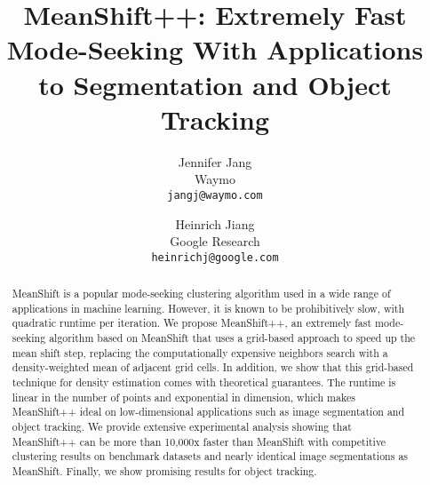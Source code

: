 \documentclass[final]{cvpr}
\theoremstyle{definition}
\begin{document}
\title{MeanShift++: Extremely Fast Mode-Seeking With Applications to Segmentation and Object Tracking}

\author{Jennifer Jang\\
Waymo\\
{\tt\small jangj@waymo.com}
\and
Heinrich Jiang\\
Google Research\\
{\tt\small heinrichj@google.com}
}

\maketitle


\begin{abstract}
   MeanShift is a popular mode-seeking clustering algorithm used in a wide range of applications in machine learning. However, it is known to be prohibitively slow, with quadratic runtime per iteration. We propose MeanShift++, an extremely fast mode-seeking algorithm based on MeanShift that uses a grid-based approach to speed up the mean shift step, replacing the computationally expensive neighbors search with a density-weighted mean of adjacent grid cells. In addition, we show that this grid-based technique for density estimation comes with theoretical guarantees. The runtime is linear in the number of points and exponential in dimension, which makes MeanShift++ ideal on low-dimensional applications such as image segmentation and object tracking. We provide extensive experimental analysis showing that MeanShift++ can be more than 10,000x faster than MeanShift with competitive clustering results on benchmark datasets and nearly identical image segmentations as MeanShift. Finally, we show promising results for object tracking.
\end{abstract}











\clearpage
{\small


}
{
\appendix
\clearpage

}
\end{document}
